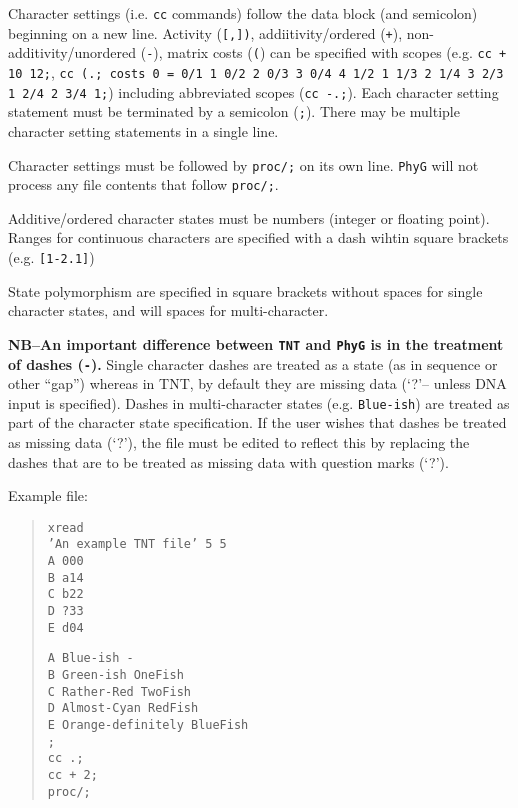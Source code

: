 \begin{description}
		Character settings (i.e. \texttt{cc} commands) follow the data block (and semicolon) beginning on a new line. 
		Activity (\texttt{[,])}, addiitivity/ordered (\texttt{+}), non-additivity/unordered (\texttt{-}), matrix costs (\texttt{(}) 
		can be specified with scopes (e.g. \texttt{cc + 10 12;}, \texttt{cc (.; costs 0 = 0/1 1 0/2 2 0/3 3 0/4 4 1/2 1 1/3 2 1/4 3 2/3 1 2/4 2 3/4 1;}) 
		including abbreviated scopes (\texttt{cc -.;}). Each character setting statement must be terminated by a 
		semicolon (\texttt{;}). There may be multiple character setting statements in a single line. 
		  
		Character settings must be followed by \texttt{proc/;} on its own line. \texttt{PhyG} will not process
		any file contents that follow \texttt{proc/;}.
		  
		 Additive/ordered character states must be numbers (integer or floating point). Ranges for continuous
		 characters are specified with a dash wihtin square brackets (e.g. \texttt{[1-2.1]})
		  
		 State polymorphism are specified in square brackets without spaces for
		 single character states, and will spaces for multi-character.
		  
		 \textbf{NB--An important difference between \texttt{TNT} and \texttt{PhyG} is in the treatment of dashes (\texttt{-}).} 
		 Single character dashes are treated as a state (as in sequence or other ``gap'') whereas in TNT, by default they 
		 are missing data (`?'-- unless DNA input is specified). Dashes in multi-character states (e.g. \texttt{Blue-ish}) are 
		 treated as part of the character state specification. If the user wishes that dashes be treated as missing data (`?'), 
		 the file must be edited to reflect this by replacing the dashes that are to be treated as missing data with question 
		 marks (`?').
		  
		  Example file:
		  	\begin{quote}
			  	\texttt{xread\\
				  	'An example TNT file' 5 5\\
				  	A 000\\
				  	B a14\\
				  	C b22\\
				  	D ?33\\
				  	E d04\\}
			  	
			  	\texttt{A Blue-ish -\\
				  	B Green-ish OneFish\\
				  	C Rather-Red TwoFish\\
				  	D Almost-Cyan RedFish\\
				  	E Orange-definitely BlueFish\\
				  	;\\
				  	cc .;\\
				  	cc + 2;\\
				  	proc/;\\}
			  \end{quote}
	\end{description}	
		
